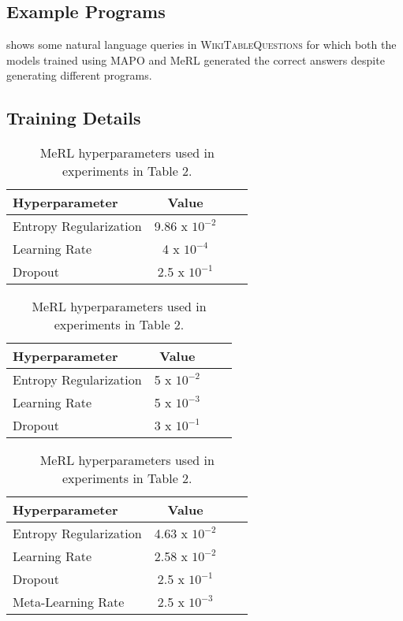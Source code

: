 \subsection{Example Programs}
 shows some natural language queries in \textsc{WikiTableQuestions} for which both the models trained using MAPO and MeRL
generated the correct answers despite generating different programs.

\subsection{Training Details}

\begin{table}[tb]
	\footnotesize
	\caption{MAPOX hyperparameters used for experiments in Table 2.}
	\label{wtq_hparam:1}
	\begin{center}
	\begin{tabular}{@{\ww}lccr@{\ww}}
	\toprule
	Hyperparameter & Value \\
	\midrule
	Entropy Regularization & 9.86 x $10^{-2}$ \\
	Learning Rate & 4 x $10^{-4}$ \\
	Dropout & 2.5 x $10^{-1}$ \\
	\bottomrule
	\end{tabular}
	\end{center}

	\caption{BoRL hyperparameters used in experiments in Table 2.}
	\label{wtq_hparam:2}
	\begin{center}
	\begin{tabular}{@{\ww}lccr@{\ww}}
	\toprule
	Hyperparameter & Value \\
	\midrule
	Entropy Regularization & 5 x $10^{-2}$ \\
	Learning Rate & 5 x $10^{-3}$ \\
	Dropout & 3 x $10^{-1}$ \\
	\bottomrule
	\end{tabular}
	\end{center}

	\caption{MeRL hyperparameters used in experiments in Table 2.}
	\label{wtq_hparam:3}
	\begin{center}
	\begin{tabular}{@{\ww}lccr@{\ww}}
	\toprule
	Hyperparameter & Value \\
	\midrule
	Entropy Regularization & 4.63 x $10^{-2}$ \\
	Learning Rate & 2.58 x $10^{-2}$ \\
	Dropout & 2.5 x $10^{-1}$ \\
	Meta-Learning Rate & 2.5 x $10^{-3}$ \\
	\bottomrule
	\end{tabular}
	\end{center}
\end{table}

